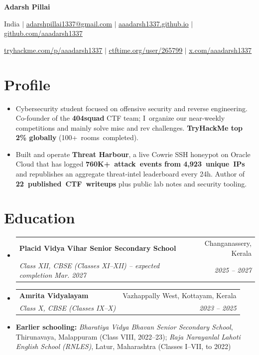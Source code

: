 \documentclass[letterpaper,11pt]{article}
\makeatletter
\newcommand{\resumeItem}[1]{
  \item\small{
    {#1\vspace{-2pt}}
  }
}
\newcommand{\resumeSubheading}[4]{
  \vspace{-2pt}\item
    \begin{tabular*}{\linewidth}[t]{l@{\extracolsep{\fill}}r}
      \textbf{#1} & #2 \\
      \textit{\small#3} & \textit{\small#4} \\
    \end{tabular*}\vspace{-7pt}
}
\newcommand{\resumeSubHeadingListStart}{\begin{itemize}[leftmargin=0.15in, label={}]}
\newcommand{\resumeSubHeadingListEnd}{\end{itemize}}
\makeatother
\begin{document}
\begin{center}
    {\Huge\bfseries Adarsh Pillai\par}
    \vspace{2pt}
    {\small
      India $|$ \href{mailto:adarshpillai1337@gmail.com}{\underline{adarshpillai1337@gmail.com}} $|$
      \href{https://aaadarsh1337.github.io/}{\underline{aaadarsh1337.github.io}} $|$
      \href{https://github.com/aaadarsh1337}{\underline{github.com/aaadarsh1337}}\par
      \vspace{2pt}
      \href{https://tryhackme.com/p/aaadarsh1337}{\underline{tryhackme.com/p/aaadarsh1337}} $|$
      \href{https://ctftime.org/user/265799}{\underline{ctftime.org/user/265799}} $|$
      \href{https://x.com/aaadarsh1337}{\underline{x.com/aaadarsh1337}}\par
    }
\end{center}


\section{Profile}
  \resumeSubHeadingListStart
    \resumeItem{Cybersecurity student focused on offensive security and reverse engineering. Co-founder of the \textbf{404squad} CTF team; I~organize our near-weekly competitions and mainly solve misc and rev challenges. \textbf{TryHackMe top 2\% globally} \mbox{(100+ rooms completed)}.}
    \resumeItem{Built and operate \textbf{Threat Harbour}, a live Cowrie SSH honeypot on Oracle Cloud that has logged \textbf{760K+~attack~events from 4,923~unique~IPs} and republishes an aggregate threat-intel leaderboard every 24h. Author of \textbf{22~published~CTF~writeups} plus public lab notes and security tooling.}
  \resumeSubHeadingListEnd


\section{Education}
  \resumeSubHeadingListStart
    \resumeSubheading
      {Placid Vidya Vihar Senior Secondary School}{Changanassery, Kerala}
      {Class XII, CBSE (Classes XI--XII) -- expected completion Mar. 2027}{2025 -- 2027}
    \resumeSubheading
      {Amrita Vidyalayam}{Vazhappally West, Kottayam, Kerala}
      {Class X, CBSE (Classes IX--X)}{2023 -- 2025}
    \resumeItem{\textbf{Earlier schooling:} \emph{Bharatiya Vidya Bhavan Senior Secondary School}, Thirunavaya, Malappuram (Class VIII, 2022--23); \emph{Raja Narayanlal Lahoti English School (RNLES)}, Latur, Maharashtra (Classes I--VII, to 2022)}
  \resumeSubHeadingListEnd
\end{document}
